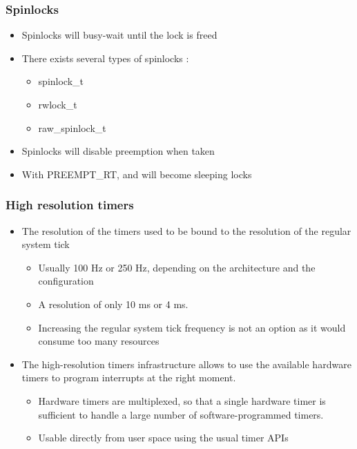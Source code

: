 \begin{frame}
  \frametitle{Spinlocks}
  	\begin{itemize}
		\item Spinlocks will busy-wait until the lock is freed
		\item There exists several types of spinlocks :
		\begin{itemize}
			\item spinlock\_t
			\item rwlock\_t
			\item raw\_spinlock\_t
		\end{itemize}
		\item Spinlocks will disable preemption when taken
		\item With PREEMPT\_RT,  and  will become sleeping locks
	\end{itemize}
\end{frame}

\begin{frame}
  \frametitle{High resolution timers}
  \begin{itemize}
  \item The resolution of the timers used to be bound to the
    resolution of the regular system tick
    \begin{itemize}
    \item Usually 100 Hz or 250 Hz, depending on the architecture and
      the configuration
    \item A resolution of only 10 ms or 4 ms.
    \item Increasing the regular system tick frequency is not an
      option as it would consume too many resources
    \end{itemize}
  \item The high-resolution timers infrastructure allows to use
    the available hardware timers to program interrupts
    at the right moment.
    \begin{itemize}
    \item Hardware timers are multiplexed, so that a single hardware
      timer is sufficient to handle a large number of
      software-programmed timers.
    \item Usable directly from user space using the usual timer APIs
    \end{itemize}
  \end{itemize}
\end{frame}

